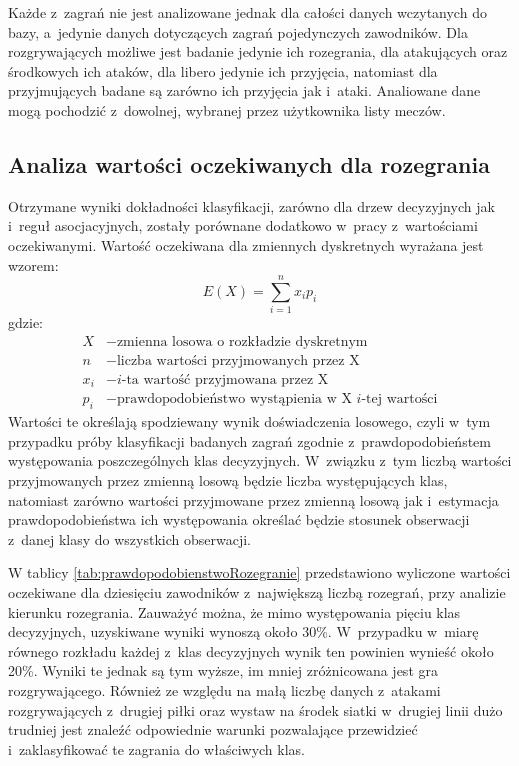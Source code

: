 \documentclass[a4paper,twoside,12pt]{book}
\begin{document}
Każde z~zagrań nie jest analizowane jednak dla całości danych wczytanych do bazy, a~jedynie danych dotyczących zagrań pojedynczych zawodników. Dla rozgrywających możliwe jest badanie jedynie ich rozegrania, dla atakujących oraz środkowych ich ataków, dla libero jedynie ich przyjęcia, natomiast dla przyjmujących badane są zarówno ich przyjęcia jak i~ataki. Analiowane dane mogą pochodzić z~dowolnej, wybranej przez użytkownika listy meczów.

\subsection{Analiza wartości oczekiwanych dla rozegrania}
Otrzymane wyniki dokładności klasyfikacji, zarówno dla drzew decyzyjnych jak i~reguł asocjacyjnych, zostały porównane dodatkowo w~pracy z~wartościami oczekiwanymi. Wartość oczekiwana dla zmiennych dyskretnych wyrażana jest wzorem:
\begin{equation}
\label{wz:warocz}
E(X) = \sum_{i=1}^{n} x_i p_i
\end{equation}
gdzie:
\begin{align*}
	X	&- \text{zmienna losowa o~rozkładzie dyskretnym}\\
	n	&- \text{liczba wartości przyjmowanych przez X}\\
	x_i	&- \text{$i$-ta wartość przyjmowana przez X}\\
	p_i &- \text{prawdopodobieństwo wystąpienia w~X $i$-tej wartości}
\end{align*}
Wartości te określają spodziewany wynik doświadczenia losowego, czyli w~tym przypadku próby klasyfikacji badanych zagrań zgodnie z~prawdopodobieństem występowania poszczególnych klas decyzyjnych. W~związku z~tym liczbą wartości przyjmowanych przez zmienną losową będzie liczba występujących klas, natomiast zarówno wartości przyjmowane przez zmienną losową jak i~estymacja prawdopodobieństwa ich występowania określać będzie stosunek obserwacji z~danej klasy do wszystkich obserwacji.

W tablicy \ref{tab:prawdopodobienstwoRozegranie} przedstawiono wyliczone wartości oczekiwane dla dziesięciu zawodników z~największą liczbą rozegrań, przy analizie kierunku rozegrania. Zauważyć można, że mimo występowania pięciu klas decyzyjnych, uzyskiwane wyniki wynoszą około 30\%. W~przypadku w~miarę równego rozkładu każdej z~klas decyzyjnych wynik ten powinien wynieść około 20\%. Wyniki te jednak są tym wyższe, im mniej zróżnicowana jest gra rozgrywającego. Również ze względu na małą liczbę danych z~atakami rozgrywających z~drugiej piłki oraz wystaw na środek siatki w~drugiej linii dużo trudniej jest znaleźć odpowiednie warunki pozwalające przewidzieć i~zaklasyfikować te zagrania do właściwych klas.
\end{document}
